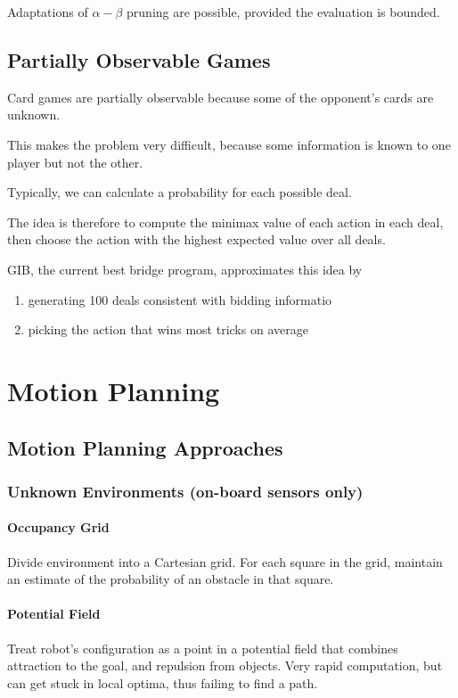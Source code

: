 Adaptations of $\alpha-\beta$ pruning are possible, provided the evaluation is
bounded.

\section{Partially Observable Games}
Card games are partially observable because some of the opponent's cards are
unknown.

This makes the problem very difficult, because some information is known to one
player but not the other.

Typically, we can calculate a probability for each possible deal.

The idea is therefore to compute the minimax value of each action in each deal,
then choose the action with the highest expected value over all deals.

GIB, the current best bridge program, approximates this idea by
\begin{enumerate}
    \item generating 100 deals consistent with bidding informatio
    \item picking the action that wins most tricks on average
\end{enumerate}

\chapter{Motion Planning}
\section{Motion Planning Approaches}
\subsection{Unknown Environments (on-board sensors only)}
\subsubsection{Occupancy Grid}
Divide environment into a Cartesian grid. For each square in the grid, maintain
an estimate of the probability of an obstacle in that square.

\subsubsection{Potential Field}
Treat robot's configuration as a point in a potential field that combines
attraction to the goal, and repulsion from objects. Very rapid computation, but
can get stuck in local optima, thus failing to find a path.

